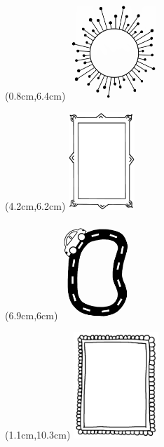 \begin{textblock*}{6cm}(0.8cm,6.4cm) %
  \includegraphics[width=3.3cm]{./bilder/ramar/Ram7.png} %
\end{textblock*}

\begin{textblock*}{6cm}(4.2cm,6.2cm) %
  \includegraphics[width=2.5cm]{./bilder/ramar/ram1.png} %
\end{textblock*}

\begin{textblock*}{6cm}(6.9cm,6cm) %
  \includegraphics[width=2.8cm]{./bilder/ramar/Ram8.png} %
\end{textblock*}



\begin{textblock*}{6cm}(1.1cm,10.3cm) %
  \includegraphics[angle=-90, width=3.2cm]{./bilder/ramar/Ram3.png} %
\end{textblock*}


